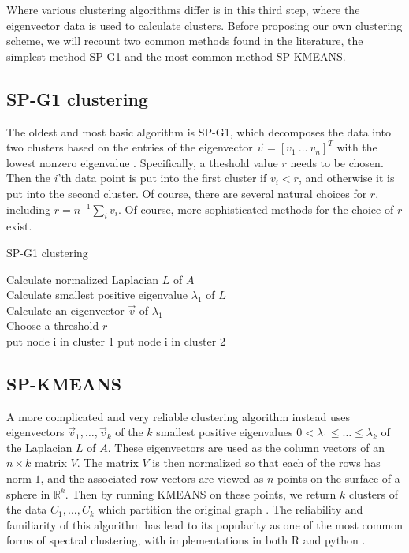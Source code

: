\documentclass[10pt,journal,compsoc]{IEEEtran} %
\theoremstyle{definition}
\newcommand{\bbr}{\mathbb R}
\begin{document}
Where various clustering algorithms differ is in this third step,
where the eigenvector data is used to calculate clusters.  Before proposing our
own clustering scheme, we will recount two common methods found in the
literature, the simplest method SP-G1 and the most common method SP-KMEANS.

\subsection{SP-G1 clustering}
The oldest and most basic algorithm is SP-G1, which decomposes the data
into two clusters based on the entries of the eigenvector
$\vec v = [v_1\ \dots\ v_n]^T$ with the lowest nonzero eigenvalue
\cite{fiedler1975property}\cite{jain1988algorithms}.  Specifically, a
theshold value $r$ needs to be chosen.  Then the $i$'th data point is put into
the first cluster if $v_i < r$, and otherwise it is put into the
second cluster.  Of course, there are several natural choices for $r$,
including $r = n^{-1}\sum_{i}v_i$.  Of course, more sophisticated
methods for the choice of $r$ exist\cite{shi2000normalized}.

\begin{algorithm}
    \caption{SP-G1 clustering} 
   Calculate normalized Laplacian $L$ of $A$\\ Calculate
smallest positive eigenvalue $\lambda_1$ of $L$\\ Calculate an
eigenvector $\vec v$ of $\lambda_1$\\ Choose a threshold $r$\\
 { put node i in cluster 1 } { put node i in cluster 2 }
\end{algorithm}

\subsection{SP-KMEANS}
A more complicated and very reliable clustering algorithm instead uses
eigenvectors $\vec v_1,\dots,\vec v_k$ of the $k$ smallest positive
eigenvalues $0<\lambda_1\leq\dots\leq \lambda_k$ of the Laplacian $L$
of $A$.  These eigenvectors are used as the column vectors of an
$n\times k$ matrix $V$.  The matrix $V$ is then normalized so that
each of the rows has norm $1$, and the associated row vectors are
viewed as $n$ points on the surface of a sphere in $\bbr^k$.  Then by
running KMEANS on these points, we return $k$ clusters of the data
$C_1,\dots, C_k$ which partition the original graph
\cite{ng2002spectral}\cite{meila2001learning}.  The reliability and
familiarity of this algorithm has lead to its popularity as one of the
most common forms of spectral clustering, with implementations in both
R and python \cite{scikit-learn}\cite{kernlab}.
\end{document}
